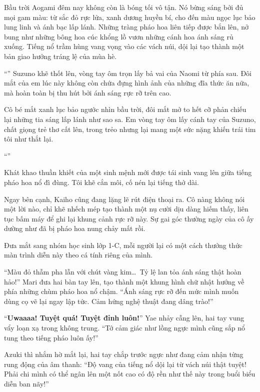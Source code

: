 \documentclass[../main.tex]{subfiles}
\begin{document}
Bầu trời Aogami đêm nay không còn là bóng tối vô tận. Nó bừng sáng bởi đủ mọi gam màu: từ sắc đỏ rực lửa, xanh dương huyền bí, cho đến màu ngọc lục bảo lung linh và ánh bạc lấp lánh. Những tràng pháo hoa liên tiếp được bắn lên, nở bung như những bông hoa cúc khổng lồ vươn những cánh hoa ánh sáng rủ xuống. Tiếng nổ trầm hùng vang vọng vào các vách núi, dội lại tạo thành một bản giao hưởng tráng lệ của mùa hè.

``'' Suzuno khẽ thốt lên, vòng tay ôm trọn lấy bả vai của Naomi từ phía sau. Đôi mắt của em lúc này không còn chứa đựng hình ảnh của những đĩa thức ăn nữa, mà hoàn toàn bị thu hút bởi ánh sáng rực rỡ trên cao.

Cô bé mắt xanh lục bảo ngước nhìn bầu trời, đôi mắt mở to hết cỡ phản chiếu lại những tia sáng lấp lánh như sao sa. Em vòng tay ôm lấy cánh tay của Suzuno, chất giọng trẻ thơ cất lên, trong trẻo nhưng lại mang một sức nặng khiến trái tim tôi như thắt lại.

``''

Khát khao thuần khiết của một sinh mệnh mới được tái sinh vang lên giữa tiếng pháo hoa nổ đì đùng. Tôi khẽ cắn môi, cố nén lại tiếng thở dài.

Ngay bên cạnh, Kaiho cũng đang lặng lẽ rút điện thoại ra. Cô nàng không nói một lời nào, chỉ khẽ nhếch mép tạo thành một nụ cười dịu dàng hiếm thấy, liên tục bấm máy để ghi lại khung cảnh rực rỡ này. Sự gai góc thường ngày của cô ấy dường như đã bị pháo hoa nung chảy mất rồi.

Đưa mắt sang nhóm học sinh lớp 1-C, mỗi người lại có một cách thưởng thức màn trình diễn này theo cá tính riêng của mình.

``Màu đỏ thẫm pha lẫn với chút vàng kim\dots\ Tỷ lệ lan tỏa ánh sáng thật hoàn hảo!'' Mari đưa hai bàn tay lên, tạo thành một khung hình chữ nhật hướng về phía những chùm pháo hoa nổ chậm. ``Ánh sáng rực rỡ đến mức mình muốn dùng cọ vẽ lại ngay lập tức. Cảm hứng nghệ thuật đang dâng trào!''

``\textbf{Uwaaaa! Tuyệt quá! Tuyệt đỉnh luôn!}'' Yae nhảy cẫng lên, hai tay vung vẩy loạn xạ trong không trung. ``Tớ cảm giác như lồng ngực mình cũng sắp nổ tung theo tiếng pháo luôn ấy!''

Azuki thì nhắm hờ mắt lại, hai tay chắp trước ngực như đang cảm nhận từng rung động của âm thanh: ``Độ vang của tiếng nổ dội lại từ vách núi thật tuyệt! Phải chi mình có thể ngân lên một nốt cao có độ rền như thế này trong buổi biểu diễn ban nãy!''
\end{document}
